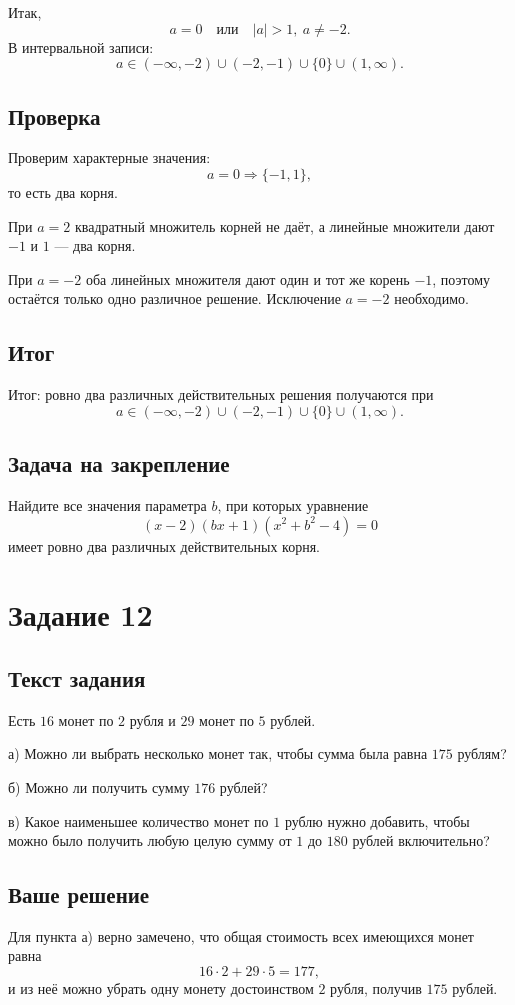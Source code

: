 \documentclass[12pt,a4paper]{article}
\begin{document}
Итак,
\[
\boxed{a=0\quad\text{или}\quad |a|>1,\ a\ne-2}.
\]
В интервальной записи:
\[
\boxed{a\in(-\infty,-2)\cup(-2,-1)\cup\{0\}\cup(1,\infty)}.
\]

\subsection*{Проверка}
Проверим характерные значения:
\[
a=0 \Rightarrow \{-1,1\},
\]
то есть два корня.

При $a=2$ квадратный множитель корней не даёт, а линейные множители дают $-1$ и $1$ --- два корня.

При $a=-2$ оба линейных множителя дают один и тот же корень $-1$, поэтому остаётся только одно различное решение. Исключение $a=-2$ необходимо.

\subsection*{Итог}
\textcolor{teal!60!black}{Итог:} ровно два различных действительных решения получаются при
\[
a\in(-\infty,-2)\cup(-2,-1)\cup\{0\}\cup(1,\infty).
\]

\subsection*{Задача на закрепление}
Найдите все значения параметра $b$, при которых уравнение
\[
(x-2)(bx+1)(x^2+b^2-4)=0
\]
имеет ровно два различных действительных корня.

\newpage
{}\label{task:12}
\section*{Задание 12}

\subsection*{Текст задания}
Есть $16$ монет по $2$ рубля и $29$ монет по $5$ рублей.

а) Можно ли выбрать несколько монет так, чтобы сумма была равна $175$ рублям?

б) Можно ли получить сумму $176$ рублей?

в) Какое наименьшее количество монет по $1$ рублю нужно добавить, чтобы можно было получить любую целую сумму от $1$ до $180$ рублей включительно?

\subsection*{Ваше решение}
Для пункта а) верно замечено, что общая стоимость всех имеющихся монет равна
\[
16\cdot2+29\cdot5=177,
\]
и из неё можно убрать одну монету достоинством $2$ рубля, получив $175$ рублей.
\end{document}

